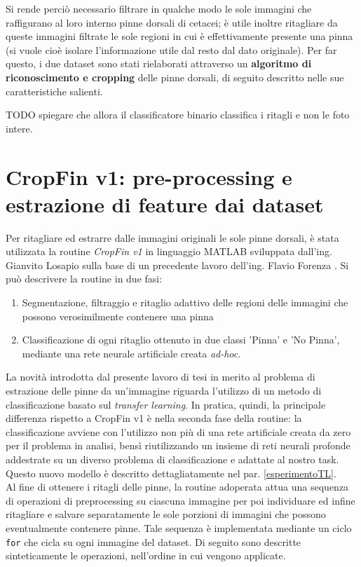 Si rende perciò necessario filtrare in qualche modo le sole immagini che raffigurano al loro interno pinne dorsali di cetacei; è utile inoltre ritagliare da queste immagini filtrate le sole regioni in cui è effettivamente presente una pinna (si vuole cioè isolare l'informazione utile dal resto dal dato originale). Per far questo, i due dataset sono stati rielaborati attraverso un \textbf{algoritmo di riconoscimento e cropping} delle pinne dorsali, di seguito descritto nelle sue caratteristiche salienti.

TODO spiegare che allora il classificatore binario classifica i ritagli e non le foto intere.

\section{CropFin v1: pre-processing e estrazione di feature dai dataset}
Per ritagliare ed estrarre dalle immagini originali le sole pinne dorsali, è stata utilizzata la routine \textit{CropFin v1} in linguaggio MATLAB sviluppata dall'ing. Gianvito Losapio \cite{gianvito} sulla base di un precedente lavoro dell'ing. Flavio Forenza \cite{flavio}.
Si può descrivere la routine in due fasi:
\begin{enumerate}
\item Segmentazione, filtraggio e ritaglio adattivo delle regioni delle immagini che possono verosimilmente contenere una pinna
\item Classificazione di ogni ritaglio ottenuto in due classi 'Pinna' e 'No Pinna', mediante una rete neurale artificiale creata \textit{ad-hoc}.
\end{enumerate}

La novità introdotta dal presente lavoro di tesi in merito al problema di estrazione delle pinne da un'immagine riguarda l'utilizzo di un metodo di classificazione basato sul \textit{transfer learning}. In pratica, quindi, la principale differenza rispetto a CropFin v1 è nella seconda fase della routine: la classificazione avviene con l'utilizzo non più di una rete artificiale creata da zero per il problema in analisi, bensì riutilizzando un insieme di reti neurali profonde addestrate su un diverso problema di classificazione e adattate al nostro task. Questo nuovo modello è descritto dettagliatamente nel par. \ref{esperimentoTL}.\\

Al fine di ottenere i ritagli delle pinne, la routine adoperata attua una sequenza di operazioni di preprocessing su ciascuna immagine per poi individuare ed infine ritagliare e salvare separatamente le sole porzioni di immagini che possono eventualmente contenere pinne. Tale sequenza è implementata mediante un ciclo \verb|for| che cicla su ogni immagine del dataset. Di seguito sono descritte sinteticamente le operazioni, nell'ordine in cui vengono applicate.

